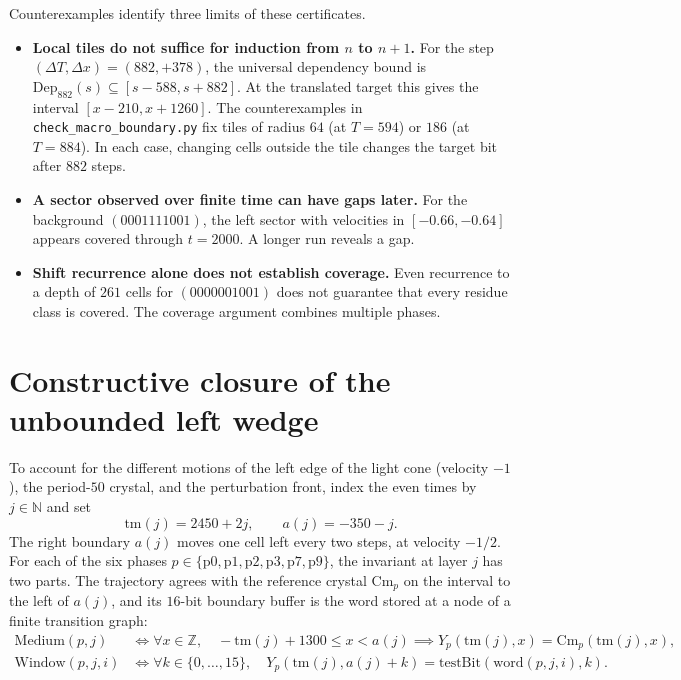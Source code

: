 \documentclass[11pt, a4paper]{article}
\begin{document}
Counterexamples identify three limits of these certificates.
\begin{itemize}
    \item \textbf{Local tiles do not suffice for induction from $n$ to $n+1$.} For the step $(\Delta T, \Delta x) = (882, +378)$, the universal dependency bound is $\mathrm{Dep}_{882}(s) \subseteq [s - 588, s + 882]$. At the translated target this gives the interval $[x - 210, x + 1260]$. The counterexamples in \texttt{check\_macro\_boundary.py} fix tiles of radius $64$ (at $T=594$) or $186$ (at $T=884$). In each case, changing cells outside the tile changes the target bit after $882$ steps.
    \item \textbf{A sector observed over finite time can have gaps later.} For the background $(0001111001)$, the left sector with velocities in $[-0.66, -0.64]$ appears covered through $t = 2000$. A longer run reveals a gap.
    \item \textbf{Shift recurrence alone does not establish coverage.} Even recurrence to a depth of $261$ cells for $(0000001001)$ does not guarantee that every residue class is covered. The coverage argument combines multiple phases.
\end{itemize}

\section{Constructive closure of the unbounded left wedge}

To account for the different motions of the left edge of the light cone (velocity $-1$), the period-$50$ crystal, and the perturbation front, index the even times by $j \in \mathbb{N}$ and set
\begin{equation}
\mathrm{tm}(j) = 2450 + 2j, \qquad a(j) = -350 - j.
\end{equation}
The right boundary $a(j)$ moves one cell left every two steps, at velocity $-1/2$. For each of the six phases $p \in \{\mathrm{p0}, \mathrm{p1}, \mathrm{p2}, \mathrm{p3}, \mathrm{p7}, \mathrm{p9}\}$, the invariant at layer $j$ has two parts. The trajectory agrees with the reference crystal $\mathrm{Cm}_p$ on the interval to the left of $a(j)$, and its $16$-bit boundary buffer is the word stored at a node of a finite transition graph:
\begin{align}
\mathrm{Medium}(p, j) &\iff \forall x \in \mathbb{Z},\quad -\mathrm{tm}(j) + 1300 \le x < a(j) \implies Y_p(\mathrm{tm}(j), x) = \mathrm{Cm}_p(\mathrm{tm}(j), x), \\
\mathrm{Window}(p, j, i) &\iff \forall k \in \{0, \dots, 15\},\quad Y_p(\mathrm{tm}(j), a(j) + k) = \mathrm{testBit}(\mathrm{word}(p, j, i), k).
\end{align}
\end{document}

